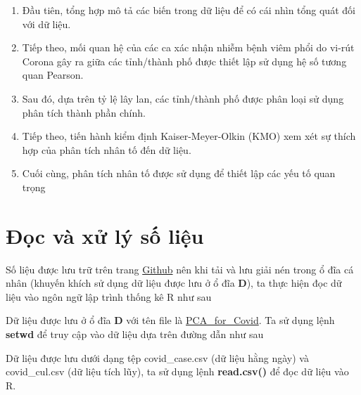 \documentclass[../thesis.tex]{subfiles}
\begin{document}
\begin{enumerate}
	\item Đầu tiên, tổng hợp mô tả các biến trong dữ liệu để có cái nhìn tổng quát đối với dữ liệu.
	\item Tiếp theo, mối quan hệ của các ca xác nhận nhiễm bệnh viêm phổi do vi-rút Corona gây ra giữa các tỉnh/thành phố được thiết lập sử dụng hệ số tương quan Pearson.
	\item Sau đó, dựa trên tỷ lệ lây lan, các tỉnh/thành phố được phân loại sử dụng phân tích thành phần chính.
	\item Tiếp theo, tiến hành kiểm định Kaiser-Meyer-Olkin (KMO) xem xét sự thích hợp của phân tích nhân tố đến dữ liệu.
	\item Cuối cùng, phân tích nhân tố được sử dụng để thiết lập các yếu tố quan trọng 
\end{enumerate}

\newpage
\section{Đọc và xử lý số liệu}


Số liệu được lưu trữ trên trang \href{https://github.com/hungtrannam/PCA_for_Covid19}{Github} nên khi tải và lưu giải nén trong ổ đĩa cá nhân (khuyến khích sử dụng dữ liệu được lưu ở ổ đĩa \textbf{D}), ta thực hiện đọc dữ liệu vào ngôn ngữ lập trình thống kê R như sau

Dữ liệu được lưu ở ổ đĩa \textbf{D} với tên file là \href{https://github.com/hungtrannam/PCA_for_Covid19/tree/main/Data}{PCA\_for\_Covid}. Ta sử dụng lệnh \textbf{setwd} để truy cập vào dữ liệu dựa trên đường dẫn như sau

\begin{Shaded}
	\begin{Highlighting}[]
\NormalTok{(}\NormalTok{)}
	\end{Highlighting}
\end{Shaded}

Dữ liệu được lưu dưới dạng tệp \textsf{covid\_case.csv} (dữ liệu hằng ngày) và \textsf{covid\_cul.csv} (dữ liệu tích lũy), ta sử dụng lệnh \textbf{read.csv()} để đọc dữ liệu vào R.

\begin{Shaded}
	\begin{Highlighting}[]
\OtherTok{\textless{}{-}} \NormalTok{(}\NormalTok{, }
		 \NormalTok{,}
		 \NormalTok{, }
		 \NormalTok{)}
\OtherTok{\textless{}{-}} \NormalTok{(}\NormalTok{, }
		 \NormalTok{,}
		 \NormalTok{)}
	\end{Highlighting}
\end{Shaded}
\end{document}
